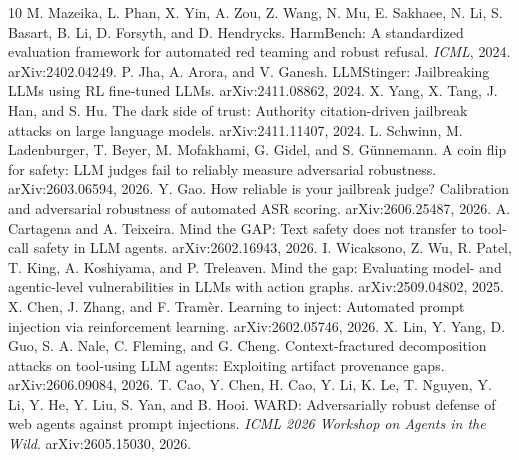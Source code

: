 \documentclass[10pt]{article}
\begin{document}
\begin{thebibliography}{10}
M. Mazeika, L. Phan, X. Yin, A. Zou, Z. Wang, N. Mu, E. Sakhaee, N. Li, S. Basart, B. Li, D. Forsyth, and D. Hendrycks.
HarmBench: A standardized evaluation framework for automated red teaming and robust refusal.
\emph{ICML}, 2024. arXiv:2402.04249.
P. Jha, A. Arora, and V. Ganesh.
LLMStinger: Jailbreaking LLMs using RL fine-tuned LLMs.
arXiv:2411.08862, 2024.
X. Yang, X. Tang, J. Han, and S. Hu.
The dark side of trust: Authority citation-driven jailbreak attacks on large language models.
arXiv:2411.11407, 2024.
L. Schwinn, M. Ladenburger, T. Beyer, M. Mofakhami, G. Gidel, and S. G\"unnemann.
A coin flip for safety: LLM judges fail to reliably measure adversarial robustness.
arXiv:2603.06594, 2026.
Y. Gao.
How reliable is your jailbreak judge? Calibration and adversarial robustness of automated ASR scoring.
arXiv:2606.25487, 2026.
A. Cartagena and A. Teixeira.
Mind the GAP: Text safety does not transfer to tool-call safety in LLM agents.
arXiv:2602.16943, 2026.
I. Wicaksono, Z. Wu, R. Patel, T. King, A. Koshiyama, and P. Treleaven.
Mind the gap: Evaluating model- and agentic-level vulnerabilities in LLMs with action graphs.
arXiv:2509.04802, 2025.
X. Chen, J. Zhang, and F. Tram\`er.
Learning to inject: Automated prompt injection via reinforcement learning.
arXiv:2602.05746, 2026.
X. Lin, Y. Yang, D. Guo, S. A. Nale, C. Fleming, and G. Cheng.
Context-fractured decomposition attacks on tool-using LLM agents: Exploiting artifact provenance gaps.
arXiv:2606.09084, 2026.
T. Cao, Y. Chen, H. Cao, Y. Li, K. Le, T. Nguyen, Y. Li, Y. He, Y. Liu, S. Yan, and B. Hooi.
WARD: Adversarially robust defense of web agents against prompt injections.
\emph{ICML 2026 Workshop on Agents in the Wild}. arXiv:2605.15030, 2026.
\end{thebibliography}
\end{document}
